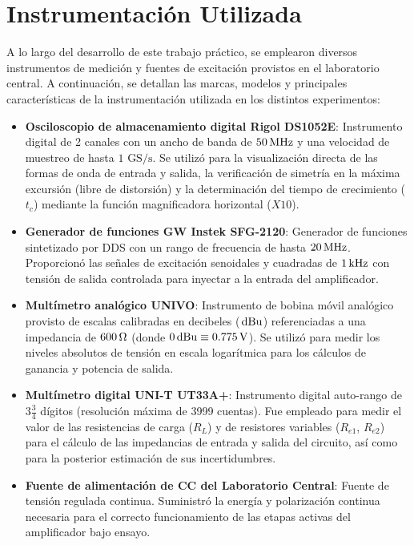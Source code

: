 \chapter{Instrumentación Utilizada}
\label{chap:instrumentacion}

A lo largo del desarrollo de este trabajo práctico, se emplearon diversos instrumentos de medición y fuentes de excitación provistos en el laboratorio central. A continuación, se detallan las marcas, modelos y principales características de la instrumentación utilizada en los distintos experimentos:

\begin{itemize}
    \item \textbf{Osciloscopio de almacenamiento digital Rigol DS1052E}:
          Instrumento digital de 2 canales con un ancho de banda de $50\MHz$ y una velocidad de muestreo de hasta $1\text{ GS/s}$. Se utilizó para la visualización directa de las formas de onda de entrada y salida, la verificación de simetría en la máxima excursión (libre de distorsión) y la determinación del tiempo de crecimiento ($t_c$) mediante la función magnificadora horizontal ($X10$).
          
    \item \textbf{Generador de funciones GW Instek SFG-2120}:
          Generador de funciones sintetizado por DDS con un rango de frecuencia de hasta $20\MHz$. Proporcionó las señales de excitación senoidales y cuadradas de $1\kHz$ con tensión de salida controlada para inyectar a la entrada del amplificador.
          
    \item \textbf{Multímetro analógico UNIVO}:
          Instrumento de bobina móvil analógico provisto de escalas calibradas en decibeles ($\dBu$) referenciadas a una impedancia de $600\ohm$ (donde $0\dBu \equiv 0.775\V$). Se utilizó para medir los niveles absolutos de tensión en escala logarítmica para los cálculos de ganancia y potencia de salida.
          
    \item \textbf{Multímetro digital UNI-T UT33A+}:
          Instrumento digital auto-rango de $3\frac{3}{4}$ dígitos (resolución máxima de 3999 cuentas). Fue empleado para medir el valor de las resistencias de carga ($R_L$) y de resistores variables ($R_{e1}$, $R_{e2}$) para el cálculo de las impedancias de entrada y salida del circuito, así como para la posterior estimación de sus incertidumbres.
          
    \item \textbf{Fuente de alimentación de CC del Laboratorio Central}:
          Fuente de tensión regulada continua. Suministró la energía y polarización continua necesaria para el correcto funcionamiento de las etapas activas del amplificador bajo ensayo.
\end{itemize}
